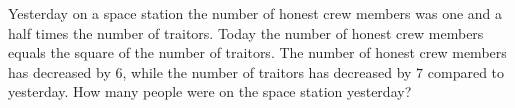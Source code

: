 Yesterday on a space station the number of honest crew members was one and a half times the number of traitors. Today the number of honest crew members equals the square of the number of traitors. The number of honest crew members has decreased by $6$, while the number of traitors has decreased by $7$ compared to yesterday. How many people were on the space station yesterday?
